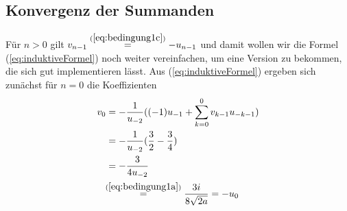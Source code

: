 \subsection{Konvergenz der Summanden} \label{sec:konvergenzDerPotReihen}
\begin{comment}
TODO: text\\
Es ist klar, dass die Potenzreihen nicht konvergent sein dürfen, trotzdem
wollen wir die Potenzreihen auf Konvergenz untersuchen
\end{comment}
Für $n>0$ gilt $v_{n-1}\overset{(\ref{eq:bedingung1c})}{=}-u_{n-1}$ und damit
wollen wir die Formel (\ref{eq:induktiveFormel}) noch weiter vereinfachen, um
eine Version zu bekommen, die sich gut implementieren lässt.
Aus (\ref{eq:induktiveFormel}) ergeben sich zunächst für $n=0$ die
Koeffizienten
\begin{align*}
v_{0} &= -\frac{1}{u_{-2}} ((-1)u_{-1} + \sum_{k=0}^{0} v_{k-1}u_{-k-1})
\\&= -\frac{1}{u_{-2}} (\frac{3}{2} - \frac{3}{4})
\\&= -\frac{3}{4u_{-2}}
\\&\!\!\overset{(\ref{eq:bedingung1a})}{=} \frac{3i}{8\sqrt{2a}} = -u_{0}
\end{align*}
